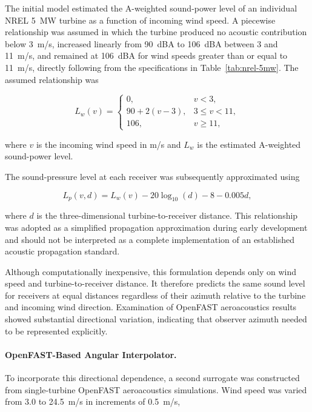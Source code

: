 \documentclass[11pt]{article}
\begin{document}
The initial model estimated the A-weighted sound-power level of an individual NREL 5~MW turbine as a function of incoming wind speed. A piecewise relationship was assumed in which the turbine produced no acoustic contribution below 3~m/s, increased linearly from 90~dBA to 106~dBA between 3 and 11~m/s, and remained at 106~dBA for wind speeds greater than or equal to 11~m/s, directly following from the specifications in Table~\ref{tab:nrel-5mw}. The assumed relationship was

\begin{equation}
L_w(v) =
\begin{cases}
    0, & v < 3, \\[4pt]
    90 + 2(v-3), & 3 \leq v < 11, \\[4pt]
    106, & v \geq 11,
\end{cases}
\label{eq:initial-sound-power}
\end{equation}

where $v$ is the incoming wind speed in m/s and $L_w$ is the estimated A-weighted sound-power level.

The sound-pressure level at each receiver was subsequently approximated using

\begin{equation}
L_p(v,d)
=
L_w(v)
-20\log_{10}(d)
-8
-0.005d,
\label{eq:initial-propagation}
\end{equation}

where $d$ is the three-dimensional turbine-to-receiver distance. This relationship was adopted as a simplified propagation approximation during early development and should not be interpreted as a complete implementation of an established acoustic propagation standard.

Although computationally inexpensive, this formulation depends only on wind speed and turbine-to-receiver distance. It therefore predicts the same sound level for receivers at equal distances regardless of their azimuth relative to the turbine and incoming wind direction. Examination of OpenFAST aeroacoustics results showed substantial directional variation, indicating that observer azimuth needed to be represented explicitly.

\paragraph{OpenFAST-Based Angular Interpolator.}

To incorporate this directional dependence, a second surrogate was constructed from single-turbine OpenFAST aeroacoustics simulations. Wind speed was varied from 3.0 to 24.5~m/s in increments of 0.5~m/s,
\end{document}
